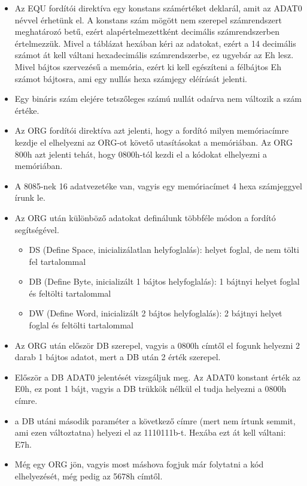 \begin{itemize}
  \item Az EQU fordítói direktíva egy konstans számértéket deklarál, amit az ADAT0 névvel érhetünk el. A konstans szám mögött nem szerepel számrendszert meghatározó betű, ezért alapértelmezettként decimális számrendszerben értelmezzük. Mivel a táblázat hexában kéri az adatokat, ezért a 14 decimális számot át kell váltani hexadecimális számrendszerbe, ez ugyebár az Eh lesz. Mivel bájtos szervezésű a memória, ezért ki kell egészíteni a félbájtos Eh számot bájtosra, ami egy nullás hexa számjegy eléírását jelenti.
  \item \colorbox{orange!30}{Egy bináris szám elejére tetszőleges számú nullát odaírva nem változik a szám értéke.}
  \item Az ORG fordítói direktíva azt jelenti, hogy a fordító milyen memóriacímre kezdje el elhelyezni az ORG-ot követő utasításokat a memóriában. Az ORG 800h azt jelenti tehát, hogy 0800h-tól kezdi el a kódokat elhelyezni a memóriában.
  \item \colorbox{orange!30}{A 8085-nek 16 adatvezetéke van, vagyis egy memóriacímet 4 hexa számjeggyel írunk le.}
  \item Az ORG után különböző adatokat definálunk többféle módon a fordító segítségével.
  \begin{itemize}
    \item DS (Define Space, inicializálatlan helyfoglalás): helyet foglal, de nem tölti fel tartalommal
    \item DB (Define Byte, inicializált 1 bájtos helyfoglalás): 1 bájtnyi helyet foglal és feltölti tartalommal
    \item DW (Define Word, inicializált 2 bájtos helyfoglalás): 2 bájtnyi helyet foglal és feltölti tartalommal
  \end{itemize}
  \item Az ORG után először DB szerepel, vagyis a 0800h címtől el fogunk helyezni 2 darab 1 bájtos adatot, mert a DB után 2 érték szerepel.
  \item Először a DB ADAT0 jelentését vizsgáljuk meg. Az ADAT0 konstant érték az E0h, ez pont 1 bájt, vagyis a DB trükkök nélkül el tudja helyezni a 0800h címre.
  \item a DB utáni második paraméter a következő címre (mert nem írtunk semmit, ami ezen változtatna) helyezi el az 1110111b-t. Hexába ezt át kell váltani: E7h.
  \item Még egy ORG jön, vagyis most máshova fogjuk már folytatni a kód elhelyezését, még pedig az 5678h címtől.

\end{itemize}
